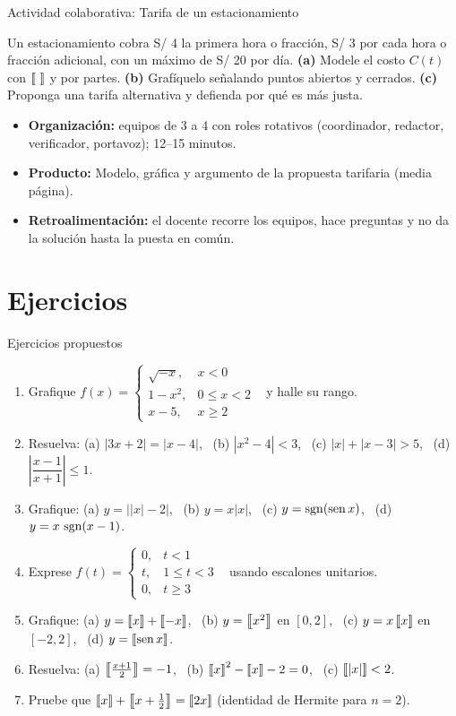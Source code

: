 \documentclass[10pt,aspectratio=169]{beamer}
\begin{document}
\begin{frame}{Actividad colaborativa: Tarifa de un estacionamiento}
  \small
  \begin{activa}
    Un estacionamiento cobra S/ 4 la primera hora o fracción, S/ 3 por cada hora o fracción adicional, con un máximo de S/ 20 por día. \textbf{(a)} Modele el costo $C(t)$ con $\left\llbracket \ \right\rrbracket$ y por partes. \textbf{(b)} Grafíquelo señalando puntos abiertos y cerrados. \textbf{(c)} Proponga una tarifa alternativa y defienda por qué es más justa.
  \end{activa}
  \begin{itemize}
    \item \textbf{Organización:} equipos de 3 a 4 con roles rotativos (coordinador, redactor, verificador, portavoz); 12--15 minutos.
    \item \textbf{Producto:} Modelo, gráfica y argumento de la propuesta tarifaria (media página).
    \item \textbf{Retroalimentación:} el docente recorre los equipos, hace preguntas y no da la solución hasta la puesta en común.
  \end{itemize}
\end{frame}

\section{Ejercicios}

\begin{frame}{Ejercicios propuestos}
  \small
  \begin{ejercicio}
    \begin{enumerate}
      \item Grafique $f(x)=\begin{cases}\sqrt{-x},&x<0\\ 1-x^2,&0\le x<2\\ x-5,&x\ge2\end{cases}$ \ y halle su rango.
      \item Resuelva: (a) $|3x+2|=|x-4|$, \ (b) $|x^2-4|<3$, \ (c) $|x|+|x-3|>5$, \ (d) $\left|\dfrac{x-1}{x+1}\right|\le1$.
      \item Grafique: (a) $y=\big||x|-2\big|$, \ (b) $y=x|x|$, \ (c) $y=\operatorname{sgn}(\operatorname{sen} x)$, \ (d) $y=x\,\operatorname{sgn}(x-1)$.
      \item Exprese $f(t)=\begin{cases}0,&t<1\\ t,&1\le t<3\\ 0,&t\ge3\end{cases}$ \ usando escalones unitarios.
      \item Grafique: (a) $y=\left\llbracket x\right\rrbracket+\left\llbracket -x\right\rrbracket$, \ (b) $y=\left\llbracket x^2\right\rrbracket$ en $[0,2]$, \ (c) $y=x\left\llbracket x\right\rrbracket$ en $[-2,2]$, \ (d) $y=\left\llbracket \operatorname{sen} x\right\rrbracket$.
      \item Resuelva: (a) $\left\llbracket \frac{x+1}{2}\right\rrbracket=-1$, \ (b) $\left\llbracket x\right\rrbracket^2-\left\llbracket x\right\rrbracket-2=0$, \ (c) $\left\llbracket |x|\right\rrbracket<2$.
      \item Pruebe que $\left\llbracket x\right\rrbracket+\left\llbracket x+\frac12\right\rrbracket=\left\llbracket 2x\right\rrbracket$ (identidad de Hermite para $n=2$).
    \end{enumerate}
  \end{ejercicio}
\end{frame}
\end{document}
